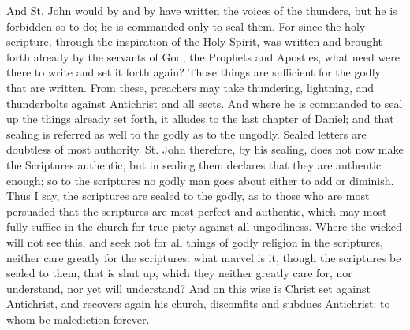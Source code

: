 And St. John would by and by have written the voices of the thunders, but he is forbidden so to do; he is commanded only to seal them. For since the holy scripture, through the inspiration of the Holy Spirit, was written and brought forth already by the servants of God, the Prophets and Apostles, what need were there to write and set it forth again? Those things are sufficient for the godly that are written. From these, preachers may take thundering, lightning, and thunderbolts against Antichrist and all sects. And where he is commanded to seal up the things already set forth, it alludes to the last chapter of Daniel; and that sealing is referred as well to the godly as to the ungodly. Sealed letters are doubtless of most authority. St. John therefore, by his sealing, does not now make the Scriptures authentic, but in sealing them declares that they are authentic enough; so to the scriptures no godly man goes about either to add or diminish. Thus I say, the scriptures are sealed to the godly, as to those who are most persuaded that the scriptures are most perfect and authentic, which may most fully suffice in the church for true piety against all ungodliness. Where the wicked will not see this, and seek not for all things of godly religion in the scriptures, neither care greatly for the scriptures: what marvel is it, though the scriptures be sealed to them, that is shut up, which they neither greatly care for, nor understand, nor yet will understand? And on this wise is Christ set against Antichrist, and recovers again his church, discomfits and subdues Antichrist: to whom be malediction forever.
